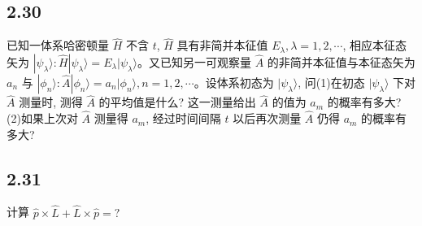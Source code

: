 \subsection{2.30}
已知一体系哈密顿量 $\hat{H}$ 不含 $t$, $\hat{H}$ 具有非简并本征值 $E_{\lambda}, \lambda = 1, 2, \cdots$, 相应本征态矢为 $|\psi_{\lambda}\rangle: \hat{H}|\psi_{\lambda}\rangle = E_{\lambda}|\psi_{\lambda}\rangle$。又已知另一可观察量 $\hat{A}$ 的非简并本征值与本征态矢为 $a_n$ 与 $|\phi_n\rangle: \hat{A}|\phi_n\rangle = a_n|\phi_n\rangle, n = 1, 2, \cdots$。设体系初态为 $|\psi_{\lambda}\rangle$, 问(1)在初态 $|\psi_{\lambda}\rangle$ 下对 $\hat{A}$ 测量时, 测得 $\hat{A}$ 的平均值是什么? 这一测量给出 $\hat{A}$ 的值为 $a_m$ 的概率有多大? (2)如果上次对 $\hat{A}$ 测量得 $a_m$, 经过时间间隔 $t$ 以后再次测量 $\hat{A}$ 仍得 $a_m$ 的概率有多大?



\newpage
\subsection{2.31}
计算 $\hat{p} \times \hat{L} + \hat{L} \times \hat{p} = ?$

